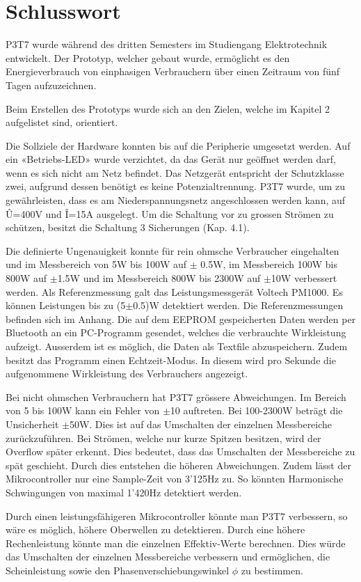 \pagebreak
\section{Schlusswort}%
P3T7 wurde während des dritten Semesters im Studiengang Elektrotechnik entwickelt. Der Prototyp, welcher gebaut wurde, ermöglicht es den Energieverbrauch von einphasigen Verbrauchern über einen Zeitraum von fünf Tagen aufzuzeichnen.  
 
Beim Erstellen des Prototyps wurde sich an den Zielen, welche im Kapitel 2 aufgelistet sind, orientiert.  
 
Die Sollziele der Hardware konnten bis auf die Peripherie umgesetzt werden. Auf ein «Betriebs-LED» wurde verzichtet, da das Gerät nur geöffnet werden darf, wenn es sich nicht am Netz befindet. Das Netzgerät entspricht der Schutzklasse zwei, aufgrund dessen benötigt es keine Potenzialtrennung. P3T7 wurde, um zu gewährleisten, dass es am Niederspannungsnetz angeschlossen werden kann, auf \^U=400V und \^I=15A ausgelegt. Um die Schaltung vor zu grossen Strömen zu schützen, besitzt die Schaltung 3 Sicherungen (Kap. 4.1).   
 
Die definierte Ungenauigkeit konnte für rein ohmsche Verbraucher eingehalten und im Messbereich von 5W bis 100W auf $\pm$ 0.5W, im Messbereich 100W bis 800W auf $\pm$1.5W und im Messbereich 800W bis 2300W auf $\pm$10W verbessert werden. Als Referenzmessung galt das Leistungsmessgerät Voltech PM1000. Es können Leistungen bis zu (5$\pm$0.5)W detektiert werden. Die Referenzmessungen befinden sich im Anhang. Die auf dem EEPROM gespeicherten Daten werden per Bluetooth an ein PC-Programm gesendet, welches die verbrauchte Wirkleistung aufzeigt. Ausserdem ist es möglich, die Daten als Textfile abzuspeichern. Zudem besitzt das Programm einen Echtzeit-Modus. In diesem wird pro Sekunde die aufgenommene Wirkleistung des Verbrauchers angezeigt.   
 
Bei nicht ohmschen Verbrauchern hat P3T7 grössere Abweichungen. Im Bereich von 5 bis 100W kann ein Fehler von $\pm$10 auftreten. Bei 100-2300W beträgt die Unsicherheit $\pm$50W. Dies ist auf das Umschalten der einzelnen Messbereiche zurückzuführen. Bei Strömen, welche nur kurze Spitzen besitzen, wird der Overflow später erkennt. Dies bedeutet, dass das Umschalten der Messbereiche zu spät geschieht. Durch dies entstehen die höheren Abweichungen. Zudem lässt der Mikrocontroller nur eine Sample-Zeit von 3’125Hz zu. So könnten Harmonische Schwingungen von maximal 1’420Hz detektiert werden.  
 
Durch einen leistungsfähigeren Mikrocontroller könnte man P3T7 verbessern, so wäre es möglich, höhere Oberwellen zu detektieren. Durch eine höhere Rechenleistung könnte man die einzelnen Effektiv-Werte berechnen. Dies würde das Umschalten der einzelnen Messbereiche verbessern und ermöglichen, die Scheinleistung sowie den Phasenverschiebungswinkel $\phi$ zu bestimmen. 

